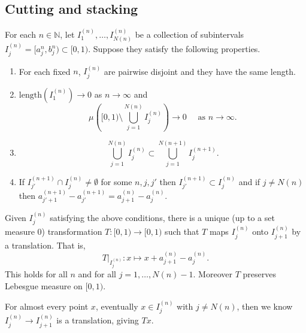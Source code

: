 \documentclass{article}
\begin{document}
\subsection{Cutting and stacking}
For each $n \in \mathbb{N}$, let $I_1^{(n)}, \dotsc, I_{N(n)}^{(n)}$ be a collection of subintervals $I_j^{(n)} = [a_j^{n}, b_j^{n}) \subset [0,1)$. %
Suppose they satisfy the following properties.
\begin{enumerate}[label=(\arabic*)]
  \item For each fixed $n$, $I_j^{(n)}$ are pairwise disjoint and they have the same length.
  \item $\text{length}(I_1^{(n)}) \to 0$ as $n \to \infty$ and
    \begin{equation*}
        \mu\left([0,1) \setminus \bigcup_{j=1}^{N(n)} I_j^{(n)}\right) \to 0 \quad \text{ as } n \to \infty.
    \end{equation*}
  \item
    \begin{equation*}\bigcup_{j = 1}^{N(n)} I_j^{(n)} \subset \bigcup_{j=1}^{N(n+1)} I_j^{(n+1)}.\end{equation*}
  \item If $I_{j'}^{(n+1)} \cap I_j^{(n)} \neq \emptyset$ for some $n,j,j'$ then $I_{j'}^{(n+1)} \subset I_j^{(n)}$ and if $j \neq N(n)$ then $a_{j'+1}^{(n+1)} - a_{j'}^{(n+1)} = a_{j+1}^{(n)} - a_j^{(n)}$.
\end{enumerate}
\begin{lemma}
  Given $I_j^{(n)}$ satisfying the above conditions, there is a unique (up to a set measure 0) transformation $T: [0,1) \to [0, 1)$ such that $T$ maps $I_j^{(n)}$ onto $I_{j+1}^{(n)}$ by a translation.%
  That is,
  \begin{equation*}
    T|_{I_j^{(n)}}:  x \mapsto x + a_{j+1}^{(n)} - a_j^{(n)}.
  \end{equation*}
  This holds for all $n$ and for all $j = 1, \dotsc, N(n)-1$.
  Moreover $T$ preserves Lebesgue measure on $[0,1)$. %
\end{lemma}
For almost every point $x$, eventually $x \in I_j^{(n)}$ with $j \neq N(n)$, then we know $I_j^{(n)} \to I_{j+1}^{(n)}$ is a translation, giving $Tx$.
\end{document}
